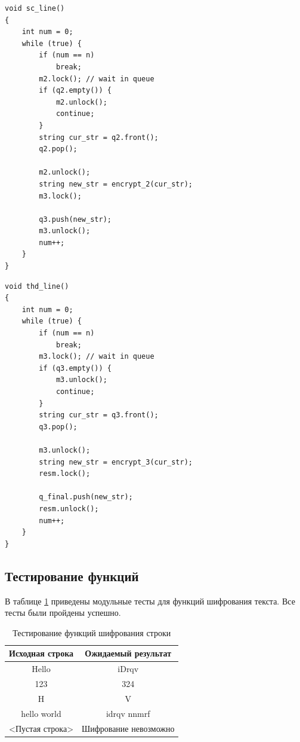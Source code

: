 \begin{lstlisting}[caption=Реализация второй ленты конвейера, label=list:canon, language={}]
void sc_line()
{
	int num = 0;
	while (true) {
		if (num == n)
			break;
		m2.lock(); // wait in queue
		if (q2.empty()) {
			m2.unlock();
			continue;
		}
		string cur_str = q2.front();
		q2.pop();

		m2.unlock();
		string new_str = encrypt_2(cur_str);
		m3.lock();
		
		q3.push(new_str);
		m3.unlock();
		num++;
	}
}
\end{lstlisting}

\begin{lstlisting}[caption=Реализация третий ленты конвейера, label=list:canon, language={}]
void thd_line()
{
	int num = 0;
	while (true) {
		if (num == n)
			break;
		m3.lock(); // wait in queue
		if (q3.empty()) {
			m3.unlock();
			continue;
		}
		string cur_str = q3.front();
		q3.pop();

		m3.unlock();
		string new_str = encrypt_3(cur_str);
		resm.lock();
		
		q_final.push(new_str);
		resm.unlock();
		num++;
	}
}
\end{lstlisting}



\subsection{Тестирование функций}

В таблице \ref{tab:tests} приведены модульные тесты для функций шифрования текста. Все тесты были пройдены успешно. \\

\begin{table}[hb]
    \caption{\centering Тестирование функций шифрования строки}
    \centering
    \begin{tabular}{|c|c|}
    \hline
    Исходная строка & Ожидаемый результат \\ \hline
        Hello & iDrqv \\ \hline
        123 & 324 \\ \hline
        H & V \\ \hline
        hello world & idrqv nnmrf \\ \hline
        <Пустая строка> & Шифрование невозможно \\ \hline
    \end{tabular}
    \label{tab:tests}
    \end{table}

